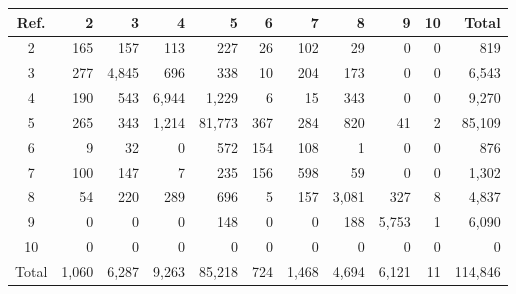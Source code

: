 \begin{tabular}{crrrrrrrrrr}
\toprule
Ref. & 2 & 3 & 4 & 5 & 6 & 7 & 8 & 9 & 10 & Total \\
\midrule
2 & 165 & 157 & 113 & 227 & 26 & 102 & 29 & 0 & 0 & 819 \\
3 & 277 & 4,845 & 696 & 338 & 10 & 204 & 173 & 0 & 0 & 6,543 \\
4 & 190 & 543 & 6,944 & 1,229 & 6 & 15 & 343 & 0 & 0 & 9,270 \\
5 & 265 & 343 & 1,214 & 81,773 & 367 & 284 & 820 & 41 & 2 & 85,109 \\
6 & 9 & 32 & 0 & 572 & 154 & 108 & 1 & 0 & 0 & 876 \\
7 & 100 & 147 & 7 & 235 & 156 & 598 & 59 & 0 & 0 & 1,302 \\
8 & 54 & 220 & 289 & 696 & 5 & 157 & 3,081 & 327 & 8 & 4,837 \\
9 & 0 & 0 & 0 & 148 & 0 & 0 & 188 & 5,753 & 1 & 6,090 \\
10 & 0 & 0 & 0 & 0 & 0 & 0 & 0 & 0 & 0 & 0 \\
\midrule
Total & 1,060 & 6,287 & 9,263 & 85,218 & 724 & 1,468 & 4,694 & 6,121 & 11 & 114,846 \\
\bottomrule
\end{tabular}
